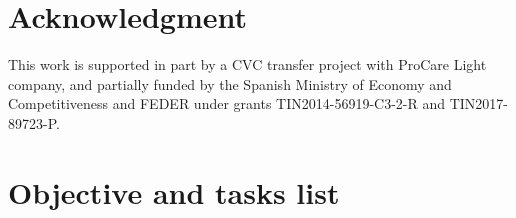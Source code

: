 \documentclass[10pt,a4paper,twocolumn,twoside]{article}
\begin{document}
	
	

	\section{Acknowledgment}
	This work is supported in part by a CVC transfer project with ProCare Light company, and partially funded by the Spanish Ministry of Economy and Competitiveness and FEDER under grants TIN2014-56919-C3-2-R and TIN2017-89723-P.
	
	
	

	\appendix

	\section{Objective and tasks list}
\end{document}

